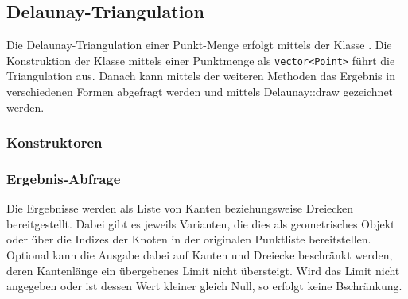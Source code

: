 \subsection{Delaunay-Triangulation}
Die Delaunay-Triangulation einer Punkt-Menge erfolgt mittels der Klasse
. Die Konstruktion der Klasse mittels einer Punktmenge als 
\verb+vector<Point>+ führt die Triangulation aus. Danach kann mittels der 
weiteren Methoden das Ergebnis in verschiedenen Formen abgefragt werden 
und mittels Delaunay::draw gezeichnet werden.

\subsubsection{Konstruktoren}


\subsubsection{Ergebnis-Abfrage}
Die Ergebnisse werden als Liste von Kanten beziehungsweise Dreiecken 
bereitgestellt. Dabei gibt es jeweils Varianten, die dies als 
geometrisches Objekt oder über die Indizes der Knoten in der 
originalen Punktliste bereitstellen. Optional kann die Ausgabe dabei
auf Kanten und Dreiecke beschränkt werden, deren Kantenlänge ein übergebenes
Limit nicht übersteigt. Wird das Limit nicht angegeben oder ist dessen
Wert kleiner gleich Null, so erfolgt keine Bschränkung.




